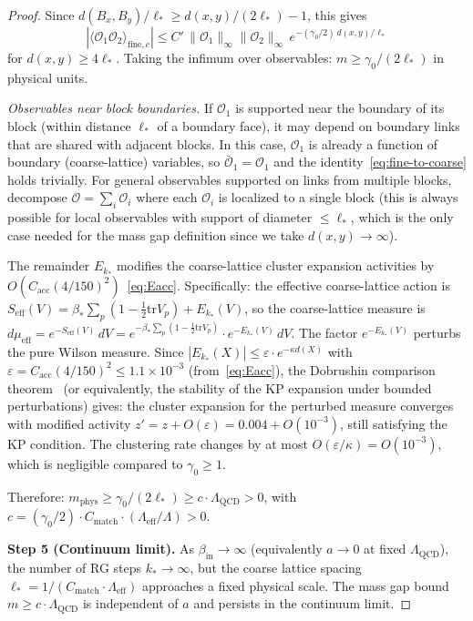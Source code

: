 \documentclass[11pt]{article}
\theoremstyle{definition}
\newcommand{\tr}{\mathrm{tr}}
\newcommand{\Lam}{\Lambda_{\mathrm{QCD}}}
\begin{document}
\begin{proof}
Since $d(B_x,B_y)/\ell_*\ge d(x,y)/(2\ell_*)-1$, this gives
\begin{equation}
|\langle\mathcal{O}_1\mathcal{O}_2\rangle_{\mathrm{fine},c}|
\le C'\,\|\mathcal{O}_1\|_\infty\|\mathcal{O}_2\|_\infty\,
e^{-(\gamma_0/2)\,d(x,y)/\ell_*}
\end{equation}
for $d(x,y)\ge 4\ell_*$.  Taking the infimum over observables:
$m\ge\gamma_0/(2\ell_*)$ in physical units.

\emph{Observables near block boundaries.}
If $\mathcal{O}_1$ is supported near the boundary of its block
(within distance $\ell_*$ of a boundary face), it may depend on
boundary links that are shared with adjacent blocks.
In this case, $\mathcal{O}_1$ is already a function of boundary
(coarse-lattice) variables, so $\bar{\mathcal{O}}_1=\mathcal{O}_1$
and the identity~\eqref{eq:fine-to-coarse} holds trivially.
For general observables supported on links from multiple blocks,
decompose $\mathcal{O}=\sum_i\mathcal{O}_i$ where each $\mathcal{O}_i$
is localized to a single block (this is always possible for local
observables with support of diameter $\le\ell_*$, which is the only
case needed for the mass gap definition since we take
$d(x,y)\to\infty$).

The remainder $E_{k_*}$ modifies the coarse-lattice cluster expansion
activities by $O(C_{\mathrm{acc}}(4/150)^2)$~\eqref{eq:Eacc}.
Specifically: the effective coarse-lattice action is
$S_{\mathrm{eff}}(V)=\beta_*\sum_p(1-\frac{1}{2}\tr V_p)+E_{k_*}(V)$,
so the coarse-lattice measure is
$d\mu_{\mathrm{eff}}=e^{-S_{\mathrm{eff}}(V)}\,dV
=e^{-\beta_*\sum_p(1-\frac{1}{2}\tr V_p)}\cdot e^{-E_{k_*}(V)}\,dV$.
The factor $e^{-E_{k_*}(V)}$ perturbs the pure Wilson measure.
Since $|E_{k_*}(X)|\le\varepsilon\cdot e^{-\kappa d(X)}$ with
$\varepsilon=C_{\mathrm{acc}}(4/150)^2\le 1.1\times 10^{-3}$
(from~\eqref{eq:Eacc}), the Dobrushin comparison
theorem~\cite{Dobrushin} (or equivalently, the stability of the
KP expansion under bounded perturbations) gives: the cluster
expansion for the perturbed measure converges with modified
activity $z'=z+O(\varepsilon)=0.004+O(10^{-3})$, still satisfying
the KP condition.  The clustering rate changes by at most
$O(\varepsilon/\kappa)=O(10^{-3})$, which is negligible compared
to $\gamma_0\ge 1$.

Therefore:
$m_{\mathrm{phys}}
\ge\gamma_0/(2\ell_*)
\ge c\cdot\Lam>0$,
with $c=(\gamma_0/2)\cdot C_{\mathrm{match}}\cdot(\Lambda_{\mathrm{eff}}/\Lambda)>0$.

\medskip\noindent\textbf{Step 5 (Continuum limit).}
As $\beta_{\mathrm{in}}\to\infty$ (equivalently $a\to 0$ at fixed
$\Lam$), the number of RG steps $k_*\to\infty$, but the coarse
lattice spacing $\ell_*=1/(C_{\mathrm{match}}\cdot\Lambda_{\mathrm{eff}})$ approaches a
fixed physical scale.  The mass gap bound
$m\ge c\cdot\Lam$ is independent of $a$ and persists in the
continuum limit.
\end{proof}
\end{document}
